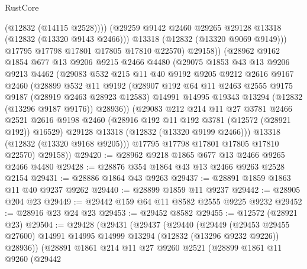 \begin{lexlean}{RustCore}
\begin{coremodule}
                  (@12832 (@14115 @2528))))
              (@29259 @9142 @2460 @29265 @29128 @13318 (@12832 (@13320 @9143 @2466)))
              @13318
              (@12832 (@13320 @9069 @9149)))
            @17795
            @17798
            @17801
            @17805
            @17810
            @22570)
          @29158))
      (@28962
        @9162
        @1854
        @677
        @13
        @9206
        @9215
        @2466
        @4480
        (@29075
          @1853
          @43
          @13
          @9206
          @9213
          @4462
          (@29083
            @532
            @215
            @11
            @40
            @9192
            @9205
            @9212
            @2616
            @9167
            @2460
            (@28899
              @532
              @11
              @9192
              (@28907
                @192
                @64
                @11
                @2463
                @2555
                @9175
                @9187
                (@28919 @2463 @28923 @12583)
                @14991
                @14995
                @19343
                @13294
                (@12832 (@13296 @9187 @9176))
                @28936))
            (@29083
              @212
              @214
              @11
              @27
              @3781
              @2466
              @2521
              @2616
              @9198
              @2460
              (@28916 @192 @11 @192 @3781 (@12572 (@28921 @192)) @16529)
              @29128
              @13318
              (@12832 (@13320 @9199 @2466)))
            @13318
            (@12832 (@13320 @9168 @9205)))
          @17795
          @17798
          @17801
          @17805
          @17810
          @22570)
        @29158))
@29420 := @28962 @9218 @1865 @677 @13 @2466 @9265 @2466 @4480
@29428 := @28876 @354 @1864 @43 @13 @2466 @9263 @2528 @2154
@29431 := @28886 @1864 @43 @9263
@29437 := @28891 @1859 @1863 @11 @40 @9237 @9262
@29440 := @28899 @1859 @11 @9237
@29442 := @28905 @204 @23
@29449 := @29442 @159 @64 @11 @8582 @2555 @9225 @9232
@29452 := @28916 @23 @24 @23
@29453 := @29452 @8582
@29455 := @12572 (@28921 @23)
@29504 := @29428
    (@29431
      (@29437
        (@29440
          (@29449
            (@29453 @29455 @27600)
            @14991
            @14995
            @14999
            @13294
            (@12832 (@13296 @9232 @9226))
            @28936))
        (@28891
          @1861
          @214
          @11
          @27
          @9260
          @2521
          (@28899
            @1861
            @11
            @9260
            (@29442

\end{coremodule}
\end{lexlean}
